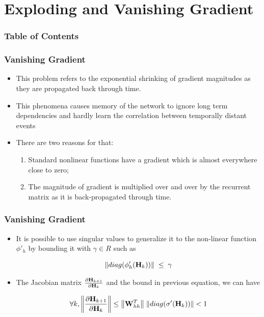 \documentclass[
	11pt,
]{beamer}
\begin{document}
\section{Exploding and Vanishing Gradient}
\begin{frame}
	\frametitle{Table of Contents}
	\tableofcontents[currentsection]
\end{frame}

\begin{frame}
	\frametitle{Vanishing Gradient}
	\begin{itemize}
		\item This problem refers to the exponential shrinking of gradient
		magnitudes as they are propagated back through time.
		\bigskip
		\item This phenomena causes memory of the network to ignore long
		term dependencies and hardly learn the correlation between
		temporally distant events
		\bigskip
		\item There are two reasons for that:
		\begin{enumerate}
			\item Standard nonlinear functions have a gradient which is almost everywhere close to zero;
			\item The magnitude of gradient is multiplied over and over by the recurrent matrix as it is back-propagated through time.
		\end{enumerate}
	\end{itemize}
\end{frame}

\begin{frame}
	\frametitle{Vanishing Gradient}
	\begin{itemize}
		\item It is possible to use singular values to generalize it to the non-linear function $\phi'_h$ by bounding it with $\gamma \in R$
		such as
		\bigskip
	\begin{block}{}
		\begin{equation*}
			\norm{diag(\phi'_h(\mathbf{H}_k))} \; \le \; \gamma
		\end{equation*}
	\end{block}
		\bigskip
		\item The Jacobian matrix $\pdv{\mathbf{H}_{k+1}}{\mathbf{H}_k}$ and the bound
		in previous equation, we can have
	\begin{block}{}
		\bigskip
		\begin{equation*}
			\forall k, \norm{\pdv{\mathbf{H}_{k+1}}{\mathbf{H}_k}}  \le \norm{\mathbf{W}_{hh}^T} \;
			 \norm{diag(\sigma'(\mathbf{H}_k))} <  1
		\end{equation*}
	\end{block}
\end{itemize}
\end{frame}
\end{document}
